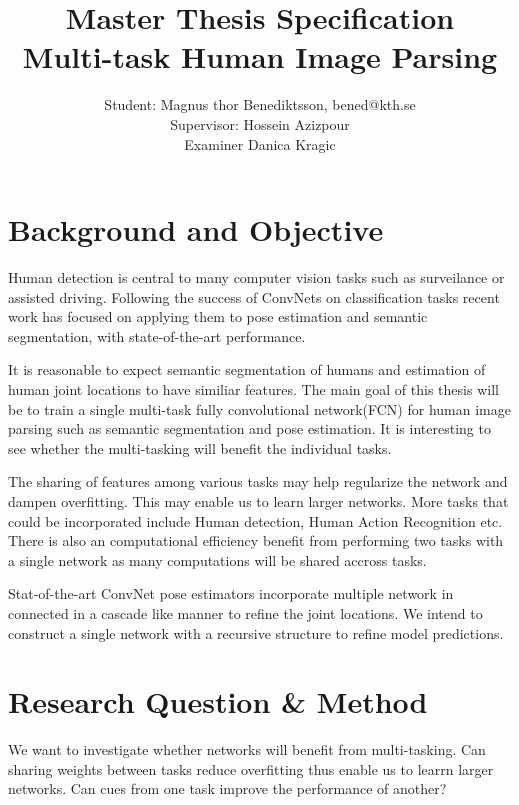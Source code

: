 \documentclass[a4paper,10pt]{article}
\title{Master Thesis Specification \\ Multi-task Human Image Parsing }
\author{Student: Magnus thor Benediktsson, bened@kth.se \\ Supervisor: Hossein Azizpour \\ Examiner Danica Kragic}
\begin{document}
\maketitle



\section{Background and Objective}

Human detection is central to many computer vision tasks such as surveilance or assisted driving.  Following the success of ConvNets on classification tasks recent work has focused on applying them to pose estimation\cite{Tompson2015}\cite{Wei2016} and semantic segmentation\cite{Long2014},\cite{Noh2015} with state-of-the-art performance.

It is reasonable to expect semantic segmentation of humans and estimation of human joint locations to have similiar features.  The main goal of this thesis will be to train a single multi-task fully convolutional network(FCN)\cite{Long2014}\cite{references in long} for human image parsing such as semantic segmentation and pose estimation. It is interesting to see whether the multi-tasking will benefit the individual tasks.

The sharing of features among various tasks may help regularize the network and dampen overfitting.  This may enable us to learn larger networks.  More tasks that could be incorporated include Human detection, Human Action Recognition etc. There is also an computational efficiency benefit from performing two tasks with a single network as many computations will be shared accross tasks.

Stat-of-the-art ConvNet pose estimators incorporate multiple network in connected in a cascade like manner  to refine the joint locations\cite{Tompson2015}\cite{Wei2016}.  We intend to construct a single network with a recursive structure to refine model predictions.



\section{Research Question \& Method}
We want to investigate whether networks will benefit from multi-tasking.  Can sharing weights between tasks reduce overfitting thus enable us to learrn larger networks.  Can cues from one task improve the performance of another? 
\end{document}
